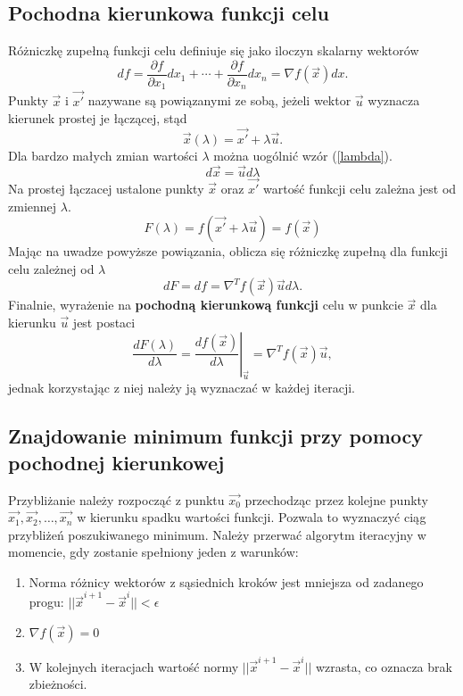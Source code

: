 \subsection{Pochodna kierunkowa funkcji celu}
Różniczkę zupełną funkcji celu definiuje się jako iloczyn skalarny wektorów
\begin{equation}
df = \frac{\partial f}{\partial x_1} dx_1 +  \cdots + \frac{\partial f}{\partial x_n} dx_n = \nabla f(\vec{x}) dx.
\end{equation}
Punkty  $\vec{x}$ i $\vec{x'}$ nazywane są powiązanymi ze sobą, jeżeli wektor $\vec{u}$ wyznacza kierunek prostej je łączącej, stąd
\begin{equation}
\vec{x}(\lambda) = \vec{x'} + \lambda \vec{u} .
\label{lambda}
\end{equation}
Dla bardzo małych zmian wartości $\lambda$ można uogólnić wzór (\ref{lambda}).
\begin{equation}
d\vec{x} = \vec{u} d\lambda
\end{equation}
Na prostej łączacej ustalone punkty $\vec{x}$ oraz $\vec{x'}$ wartość funkcji celu zależna jest od zmiennej $\lambda$.
\begin{equation}
F(\lambda) = f(\vec{x'} + \lambda \vec{u} ) = f(\vec{x})
\end{equation}
Mając na uwadze powyższe powiązania, oblicza się różniczkę zupełną dla funkcji celu zależnej od $\lambda$
\begin{equation}
dF = df = \nabla^{T} f(\vec{x}) \vec{u} d \lambda.
\end{equation}
Finalnie, wyrażenie na \textbf{pochodną kierunkową funkcji} celu w punkcie $\vec{x}$ dla kierunku $\vec{u}$ jest postaci
\begin{equation}
\frac{d F (\lambda)}{d\lambda} = \left.\frac{df(\vec{x})}{d\lambda}\right|_{\vec{u}} = \nabla^{T} f(\vec{x}) \vec{u}, 
\label{wzor}
\end{equation}
jednak korzystając z niej należy ją wyznaczać w każdej iteracji.

\subsection{Znajdowanie minimum funkcji przy pomocy pochodnej kierunkowej}
Przybliżanie należy rozpocząć z punktu $\vec{x_0}$ przechodząc przez kolejne punkty $\vec{x_1}, \vec{x_2}, \dots, \vec{x_n}$ w kierunku spadku wartości funkcji. Pozwala to wyznaczyć ciąg przybliżeń poszukiwanego minimum. Należy przerwać algorytm iteracyjny w momencie, gdy zostanie spełniony jeden z warunków:
\begin{enumerate}
	\item Norma różnicy wektorów z sąsiednich kroków jest mniejsza od zadanego progu: $||\vec{x}^{i+1} - \vec{x}^i|| < \epsilon$
	\item $\nabla f(\vec{x}) = 0$
	\item W kolejnych iteracjach wartość normy $||\vec{x}^{i+1} - \vec{x}^i||$ wzrasta, co oznacza brak zbieżności.
\end{enumerate}
